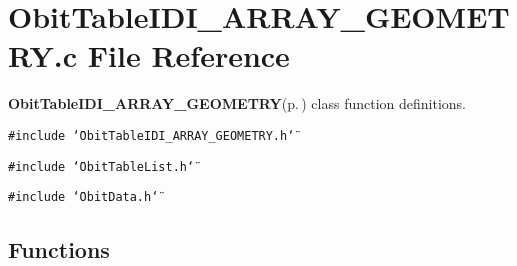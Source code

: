 \section{Obit\-Table\-IDI\_\-ARRAY\_\-GEOMETRY.c File Reference}
\label{ObitTableIDI__ARRAY__GEOMETRY_8c}
{\bf Obit\-Table\-IDI\_\-ARRAY\_\-GEOMETRY}{\rm (p.\,\pageref{structObitTableIDI__ARRAY__GEOMETRY})} class function definitions. 

{\tt \#include \char`\"{}Obit\-Table\-IDI\_\-ARRAY\_\-GEOMETRY.h\char`\"{}}\par
{\tt \#include \char`\"{}Obit\-Table\-List.h\char`\"{}}\par
{\tt \#include \char`\"{}Obit\-Data.h\char`\"{}}\par
\subsection*{Functions}
